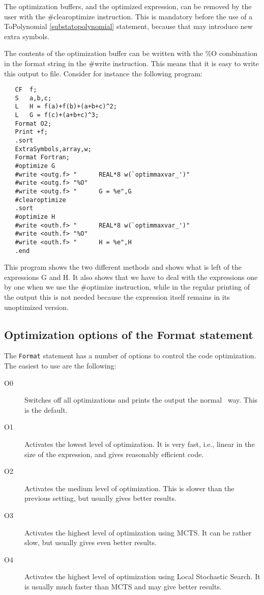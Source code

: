 The optimization buffers, and the optimized expression, can be removed by 
the user with the \#clearoptimize instruction. This is mandatory before the 
use of a ToPolynomial \ref{substatopolynomial} 
statement, because that may introduce new extra symbols.

The contents of the optimization buffer can be 
written with the \%O combination in the format string in the \#write 
instruction. This means that it is easy to write this output to file. 
Consider for instance the following program:
\begin{verbatim}
   CF  f;
   S   a,b,c;
   L   H = f(a)+f(b)+(a+b+c)^2;
   L   G = f(c)+(a+b+c)^3;
   Format O2;
   Print +f;
   .sort
   ExtraSymbols,array,w;
   Format Fortran;
   #optimize G
   #write <outg.f> "      REAL*8 w(`optimmaxvar_')"
   #write <outg.f> "%O"
   #write <outg.f> "      G = %e",G
   #clearoptimize
   .sort
   #optimize H
   #write <outh.f> "      REAL*8 w(`optimmaxvar_')"
   #write <outh.f> "%O"
   #write <outh.f> "      H = %e",H
   .end
\end{verbatim}
This program shows the two different methods and shows what is left of the 
expressions G and H. It also shows that we have to deal with the 
expressions one by one when we use the \#optimize instruction, while in the 
regular printing of the output this is not needed because the expression 
itself remains in its unoptimized version.

\subsection{Optimization options of the Format statement}

The \verb|Format| statement has a number of options to control the
code optimization. The easiest to use are the following:

\begin{description}
\item[O0] Switches off all optimizations and prints the output the
  normal \FORM\ way. This is the default.

\item[O1] Activates the lowest level of optimization. It is very fast,
  i.e., linear in the size of the expression, and gives reasonably
  efficient code.

\item[O2] Activates the medium level of optimization. This is slower
  than the previous setting, but usually gives better results.

\item[O3] Activates the highest level of optimization using MCTS\@. It can be
  rather slow, but usually gives even better results.

\item[O4] Activates the highest level of optimization using Local Stochastic Search. 
It is usually much faster than MCTS and may give better results.
\end{description}

